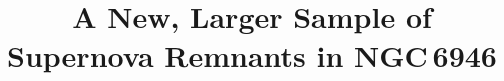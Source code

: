 


\usepackage{natbib}
\usepackage{comment}
\usepackage{todonotes}
\usepackage{graphicx}



\title{A New, Larger Sample of Supernova Remnants in NGC\,6946}



